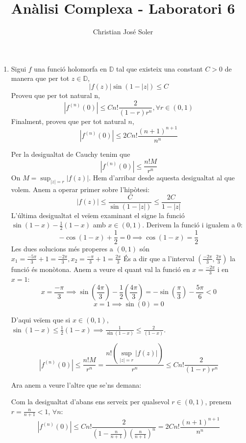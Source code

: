 \documentclass[10pt,a4paper]{article}
\author{Christian José Soler}
\title{Anàlisi Complexa - Laboratori 6}
\begin{document}
\maketitle

\begin{enumerate}
\item Sigui $f$ una funció holomorfa en $\mathbb{D}$ tal que existeix una constant $C>0$ de manera que per tot $z\in\mathbb{D}$,
$$|f(z)|\sin (1-|z|)\leq C$$Proveu que per tot natural n,
$$|f^{(n)}(0)|\leq C n! \frac{2}{(1-r)r^{n}}, \forall r\in(0,1)$$
Finalment, proveu que per tot natural $n$,
$$|f^{(n)}(0)|\leq 2 C n! \frac{(n+1)^{n+1}}{n^{n}}$$
\begin{framed}
Per la desigualtat de Cauchy tenim que
$$|f^{(n)}(0)|\leq\frac{n!M}{r^{n}}$$
On $M=\sup_{|z|=r}|f(z)|$. Hem d'arribar desde aquesta desigualtat al que volem. Anem a operar primer sobre l'hipòtesi:
$$|f(z)|\leq \frac{C}{\sin (1-|z|)}\leq \frac{2C}{1-|z|}$$
L'última desigualtat el veïem examinant el signe la funció $\sin(1-x) - \frac{1}{2}(1-x)$ amb $x\in(0,1)$. Derivem la funció i igualem a 0:
$$-\cos(1-x) + \frac{1}{2} = 0 \implies \cos(1-x) = \frac{1}{2}$$
Les dues solucions més properes a $(0,1)$ són $x_{1}=\frac{-5\pi}{3}+1=\frac{-2\pi}{3}, x_{2}=\frac{-\pi}{3}+1=\frac{2\pi}{3}$
És a dir que a l'interval $(\frac{-2\pi}{3},\frac{2\pi}{3})$ la funció és monòtona. Anem a veure el quant val la funció en $x=\frac{-2\pi}{3}$ i en $x=1$:
$$x=\frac{-\pi}{3} \implies \sin\left(\frac{4\pi}{3}\right) - \frac{1}{2}\left(\frac{4\pi}{3}\right) = 
-\sin\left(\frac{\pi}{3}\right)-\frac{5\pi}{6} < 0$$
$$x=1 \implies \sin(0) = 0$$

D'aqui veïem que si $x\in(0,1)$, $\sin(1-x) \leq \frac{1}{2}(1-x) \implies \frac{1}{\sin(1-x)} \leq \frac{2}{(1-x)}$.

$$|f^{(n)}(0)|\leq\frac{n!M}{r^{n}} = \frac{n!(\sup_{|z|=r}|f(z)|)}{r^{n}} \leq C n! \frac{2}{(1-r)r^{n}}$$

Ara anem a veure l'altre que se'ns demana:

Com la desigualtat d'abans ens serveix per qualsevol $r\in(0,1)$, prenem $r=\frac{n}{n+1}<1$, $\forall n$:
$$|f^{(n)}(0)|\leq Cn!\frac{2}{\left(1-\frac{n}{n+1}\right)\left(\frac{n}{n+1}\right)^{n}} = 2 C n! \frac{(n+1)^{n+1}}{n^{n}}$$


\end{framed}
\end{enumerate}
\end{document}
